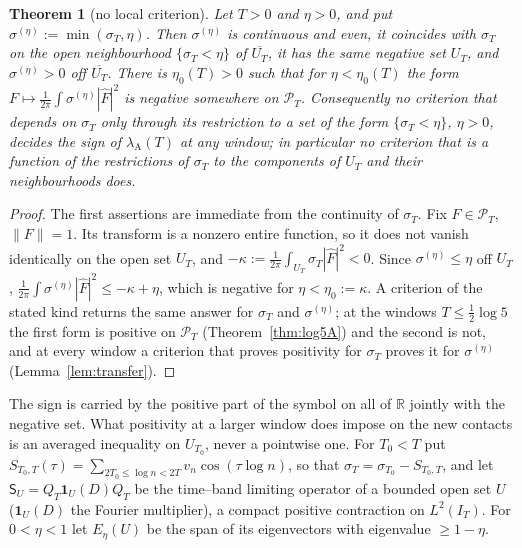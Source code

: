 \documentclass[11pt]{amsart}
\newtheorem{theorem}{Theorem}[section]
\theoremstyle{definition}
\theoremstyle{remark}
\newcommand{\R}{\mathbb R}
\newcommand{\PT}{\mathcal P_T}
\newcommand{\IT}{I_T}
\newcommand{\lamA}{\lambda_{\mathrm A}(T)}
\newcommand{\sT}{\sigma_T}
\newcommand{\Fh}{\widehat F}
\begin{document}
\begin{theorem}[no local criterion]\label{thm:nolocal}
Let $T>0$ and $\eta>0$, and put $\sigma^{(\eta)}:=\min(\sT,\eta)$. Then $\sigma^{(\eta)}$ is continuous and even, it
coincides with $\sT$ on the open neighbourhood $\{\sT<\eta\}$ of $\overline{U_T}$, it has the same negative set
$U_T$, and $\sigma^{(\eta)}>0$ off $\overline{U_T}$. There is $\eta_0(T)>0$ such that for $\eta<\eta_0(T)$ the form
$F\mapsto\frac1{2\pi}\int\sigma^{(\eta)}|\Fh|^2$ is negative somewhere on $\PT$. Consequently no criterion that depends
on $\sT$ only through its restriction to a set of the form $\{\sT<\eta\}$, $\eta>0$, decides the sign of $\lamA$ at
any window; in particular no criterion that is a function of the restrictions of $\sT$ to the components of $U_T$
and their neighbourhoods does.
\end{theorem}
\begin{proof}
The first assertions are immediate from the continuity of $\sT$. Fix $F\in\PT$, $\|F\|=1$. Its transform is a
nonzero entire function, so it does not vanish identically on the open set $U_T$, and
$-\kappa:=\frac1{2\pi}\int_{U_T}\sT|\Fh|^2<0$. Since $\sigma^{(\eta)}\le\eta$ off $U_T$,
$\frac1{2\pi}\int\sigma^{(\eta)}|\Fh|^2\le-\kappa+\eta$, which is negative for $\eta<\eta_0:=\kappa$. A criterion of the
stated kind returns the same answer for $\sT$ and $\sigma^{(\eta)}$; at the windows $T\le\frac12\log5$ the first form is
positive on $\PT$ (Theorem~\ref{thm:log5A}) and the second is not, and at every window a criterion that proves
positivity for $\sT$ proves it for $\sigma^{(\eta)}$ (Lemma~\ref{lem:transfer}).
\end{proof}

The sign is carried by the positive part of the symbol on all of $\R$ jointly with the negative set. What
positivity at a larger window does impose on the new contacts is an averaged inequality on $U_{T_0}$, never a
pointwise one. For $T_0<T$ put $S_{T_0,T}(\tau)=\sum_{2T_0\le\log n<2T}v_n\cos(\tau\log n)$, so that
$\sT=\sigma_{T_0}-S_{T_0,T}$, and let $\mathsf S_{U}=Q_T\mathbf 1_{U}(D)Q_T$ be the time--band limiting operator of a
bounded open set $U$ ($\mathbf 1_U(D)$ the Fourier multiplier), a compact positive contraction on $L^2(\IT)$. For
$0<\eta<1$ let $E_\eta(U)$ be the span of its eigenvectors with eigenvalue $\ge1-\eta$.
\end{document}
